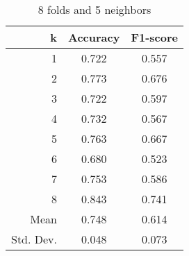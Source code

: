 \begin{table}
\centering
\caption{8 folds and 5 neighbors}
\begin{tabular}{rcc}
\toprule
         k &  Accuracy &  F1-score \\
\midrule
         1 &     0.722 &     0.557 \\
         2 &     0.773 &     0.676 \\
         3 &     0.722 &     0.597 \\
         4 &     0.732 &     0.567 \\
         5 &     0.763 &     0.667 \\
         6 &     0.680 &     0.523 \\
         7 &     0.753 &     0.586 \\
         8 &     0.843 &     0.741 \\
      Mean &     0.748 &     0.614 \\
 Std. Dev. &     0.048 &     0.073 \\
\bottomrule
\end{tabular}
\end{table}
